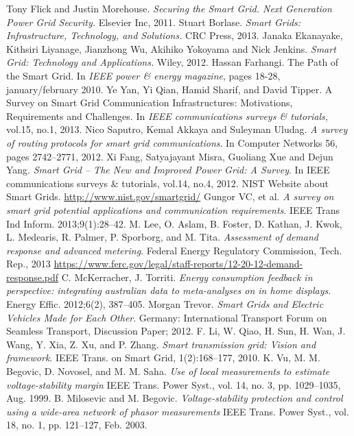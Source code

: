 \documentclass[11pt,oneside]{book}
\begin{document}
\begin{thebibliography}{99}
 Tony Flick and Justin Morehouse. \emph{Securing the Smart Grid. Next Generation Power Grid Security.} Elsevier Inc, 2011.
 Stuart Borlase. \emph{Smart Grids: Infrastructure, Technology, and Solutions.} CRC Press, 2013.
 Janaka Ekanayake, Kithsiri Liyanage, Jianzhong Wu, Akihiko Yokoyama and Nick Jenkins. \emph{Smart Grid: Technology and Applications.} Wiley, 2012.
 Hassan Farhangi. The Path of the Smart Grid. In \emph{IEEE power \& energy magazine}, pages 18-28, january/february 2010.
 Ye Yan, Yi Qian, Hamid Sharif, and David Tipper. A Survey on Smart Grid Communication Infrastructures: Motivations, Requirements and Challenges. In \emph{IEEE communications surveys \& tutorials,} vol.15, no.1, 2013.
 Nico Saputro, Kemal Akkaya and Suleyman Uludag. \emph{A survey of routing protocols for smart grid communications}. In Computer Networks 56, pages 2742–2771, 2012.
 Xi Fang, Satyajayant Misra, Guoliang Xue and Dejun Yang. \emph{Smart Grid – The New and Improved Power Grid: A Survey}. In IEEE communications surveys \& tutorials, vol.14, no.4, 2012.
 NIST Website about Smart Grids. \url{http://www.nist.gov/smartgrid/}
 Gungor VC, et al. \emph{A survey on smart grid potential applications and
communication requirements}. IEEE Trans Ind Inform. 2013;9(1):28–42.
 M. Lee, O. Aslam, B. Foster, D. Kathan, J. Kwok, L. Medearis,
R. Palmer, P. Sporborg, and M. Tita. \emph{Assessment of demand response
and advanced metering}. Federal Energy Regulatory Commission, Tech. Rep., 2013 \url{https://www.ferc.gov/legal/staff-reports/12-20-12-demand-response.pdf}
 C. McKerracher, J. Torriti. \emph{Energy consumption feedback in perspective: integrating australian data to meta-analyses on in home displays}. Energy Effic. 2012;6(2), 387–405.
 Morgan Trevor. \emph{Smart Grids and Electric Vehicles Made for Each Other}. Germany: International Transport Forum on Seamless Transport, Discussion Paper; 2012.
 F. Li, W. Qiao, H. Sun, H. Wan, J. Wang, Y. Xia, Z. Xu, and P. Zhang.
\emph{Smart transmission grid: Vision and framework}. IEEE Trans. on Smart Grid, 1(2):168–177, 2010.
 K. Vu, M. M. Begovic, D. Novosel, and M. M. Saha. \emph{Use of local measurements to estimate voltage-stability margin} IEEE Trans. Power Syst., vol. 14, no. 3, pp. 1029–1035, Aug. 1999. 
 B. Milosevic and M. Begovic. \emph{Voltage-stability protection and control using a wide-area network of phasor measurements} IEEE Trans. Power Syst., vol. 18, no. 1, pp. 121–127, Feb. 2003. 

\end{thebibliography}
\end{document}
